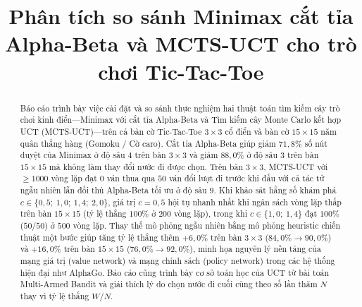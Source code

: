 \documentclass[conference]{IEEEtran}
\begin{document}
\title{Phân tích so sánh Minimax cắt tỉa Alpha-Beta và MCTS-UCT cho trò chơi Tic-Tac-Toe}

\author{
\and
{}
}


\maketitle

\begin{abstract}
Báo cáo trình bày việc cài đặt và so sánh thực nghiệm hai thuật toán tìm kiếm cây trò chơi kinh điển---Minimax với cắt tỉa Alpha-Beta và Tìm kiếm cây Monte Carlo kết hợp UCT (MCTS-UCT)---trên cả bàn cờ Tic-Tac-Toe $3\times 3$ cổ điển và bàn cờ $15\times 15$ năm quân thẳng hàng (Gomoku / Cờ caro). Cắt tỉa Alpha-Beta giúp giảm $71{,}8\%$ số nút duyệt của Minimax ở độ sâu $4$ trên bàn $3\times 3$ và giảm $88{,}0\%$ ở độ sâu $3$ trên bàn $15\times 15$ mà không làm thay đổi nước đi được chọn. Trên bàn $3\times 3$, MCTS-UCT với $\ge 1000$ vòng lặp đạt $0$ ván thua qua $50$ ván đổi lượt đi trước khi đấu với cả tác tử ngẫu nhiên lẫn đối thủ Alpha-Beta tối ưu ở độ sâu $9$. Khi khảo sát hằng số khám phá $c \in \{0{,}5;\ 1{,}0;\ 1{,}4;\ 2{,}0\}$, giá trị $c = 0{,}5$ hội tụ nhanh nhất khi ngân sách vòng lặp thấp trên bàn $15\times 15$ (tỷ lệ thắng $100\%$ ở $200$ vòng lặp), trong khi $c \in \{1{,}0;\ 1{,}4\}$ đạt $100\%$ ($50/50$) ở $500$ vòng lặp. Thay thế mô phỏng ngẫu nhiên bằng mô phỏng heuristic chiến thuật một bước giúp tăng tỷ lệ thắng thêm $+6{,}0\%$ trên bàn $3\times 3$ ($84{,}0\% \rightarrow 90{,}0\%$) và $+16{,}0\%$ trên bàn $15\times 15$ ($76{,}0\% \rightarrow 92{,}0\%$), minh họa nguyên lý nền tảng của mạng giá trị (value network) và mạng chính sách (policy network) trong các hệ thống hiện đại như AlphaGo. Báo cáo cũng trình bày cơ sở toán học của UCT từ bài toán Multi-Armed Bandit và giải thích lý do chọn nước đi cuối cùng theo số lần thăm $N$ thay vì tỷ lệ thắng $W/N$.
\end{abstract}
\end{document}
